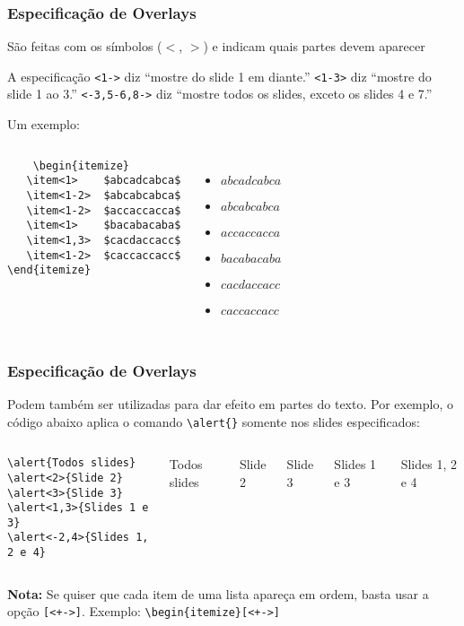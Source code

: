 \begin{frame}[fragile]
\frametitle{Especificação de Overlays}
São feitas com os símbolos ($<$, $>$) e indicam quais partes devem aparecer

A especificação \verb|<1->| diz ``mostre do slide 1 em diante.'' \verb|<1-3>| diz ``mostre do
slide 1 ao 3.'' \verb|<-3,5-6,8->| diz ``mostre todos os slides, exceto os slides 4 e 7.''

Um exemplo:
\begin{columns}
	\small
\begin{verbatim}
	\begin{itemize}
   \item<1>    $abcadcabca$
   \item<1-2>  $abcabcabca$
   \item<1-2>  $accaccacca$
   \item<1>    $bacabacaba$
   \item<1,3>  $cacdaccacc$
   \item<1-2>  $caccaccacc$
\end{itemize}
\end{verbatim}
	\small
\begin{itemize}
   \item<1>    $abcadcabca$
   \item<1-2>  $abcabcabca$
   \item<1-2>  $accaccacca$
   \item<1>    $bacabacaba$
   \item<1,3>  $cacdaccacc$
   \item<1-2>  $caccaccacc$
\end{itemize}\end{columns}

\end{frame}



\begin{frame}[fragile]
\frametitle{Especificação de Overlays}
Podem também ser utilizadas para dar efeito em partes do texto. Por exemplo, o código abaixo
aplica o comando \verb|\alert{}| somente nos slides especificados:

\begin{columns}
	\small
\begin{verbatim}
\alert{Todos slides}
\alert<2>{Slide 2}
\alert<3>{Slide 3}
\alert<1,3>{Slides 1 e 3}
\alert<-2,4>{Slides 1, 2 e 4}
\end{verbatim} 
	\alert{Todos slides}

\alert<2>{Slide 2}

\alert<3>{Slide 3}

\alert<1,3>{Slides 1 e 3}

\alert<-2,4>{Slides 1, 2 e 4}
\end{columns}
\vspace{.5cm}
\textbf{Nota:} Se quiser que cada item de uma lista apareça em ordem, basta usar a opção
\verb|[<+->]|. Exemplo: \verb|\begin{itemize}[<+->]|

\end{frame}


